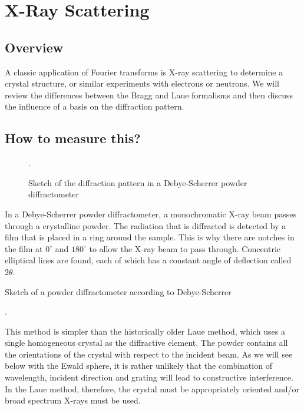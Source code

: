 \renewcommand{\chapterauthors}{Markus Lippitz}
\renewcommand{\lastmod}{September 18, 2023}


\chapter{X-Ray Scattering}




\section{Overview}
A classic application of Fourier transforms is X-ray scattering to determine a crystal structure, or similar experiments with electrons or neutrons. We will review the differences between the Bragg and Laue formalisms and then discuss the influence of a basis on the diffraction pattern.

\section{How to measure this?}

\begin{figure}
  \caption{Sketch of the diffraction pattern in a Debye-Scherrer powder diffractometer}.
\end{figure}


In a Debye-Scherrer powder diffractometer, a monochromatic X-ray beam passes through a crystalline powder. The radiation that is diffracted is detected by a film that is placed in a ring around the sample. This is why there are notches in the film at $0^\circ$ and $180^\circ$ to allow the X-ray beam to pass through. Concentric elliptical lines are found, each of which has a constant angle of deflection called $2\theta$.

\begin{marginfigure}
  \caption{Sketch of a powder diffractometer according to Debye-Scherrer}.
\end{marginfigure}

This method is simpler than the historically older Laue method, which uses a single homogeneous crystal as the diffractive element. The powder contains all the orientations of the crystal with respect to the incident beam. As we will see below with the Ewald sphere, it is rather unlikely that the combination of wavelength, incident direction and grating will lead to constructive interference. In the Laue method, therefore, the crystal must be appropriately oriented and/or broad spectrum X-rays must be used.

